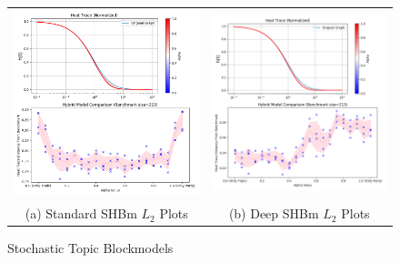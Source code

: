 \begin{singlespacing}
    \begin{figure}
        \centering
        \begin{tabular}{cc}
            \includegraphics[scale=0.3]{Figures/standard_heat_trace_plot} &
            \includegraphics[scale=0.3]{Figures/ann_heat_trace_plot} \\
            (a) Standard SHBm $L_{2}$ Plots & (b) Deep SHBm $L_{2}$ Plots\\[6pt]
        \end{tabular}
        \caption[Stochastic Topic Blockmodels]{Stochastic Topic Blockmodels}
        \label{fig:SHBm_results}
    \end{figure}
\end{singlespacing}

